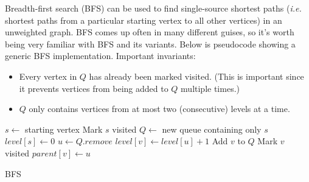 \documentclass[10pt]{book}
\begin{document}
Breadth-first search (BFS) can be used to find single-source shortest
paths (\emph{i.e.} shortest paths from a particular starting vertex to
all other vertices) in an unweighted graph. BFS comes up often in many
different guises, so it's worth being very familiar with BFS and its
variants. Below is pseudocode showing a generic BFS implementation.
Important invariants:
\begin{itemize}
\item Every vertex in $Q$ has already been marked visited. (This is
  important since it prevents vertices from being added to $Q$
  multiple times.)
\item $Q$ only contains vertices from at most two (consecutive) levels
  at a time.
\end{itemize}

\begin{center}
\begin{minipage}{0.8\textwidth}
\begin{algorithm}[H]
  \begin{algorithmic}[1]
\State $s \gets$ starting vertex
\State Mark $s$ visited
\State $Q \gets$ new queue containing only $s$
\State $\mathit{level}[s] \gets 0$
  \State $u \gets Q.\mathit{remove}$
      \State $\mathit{level}[v] \gets \mathit{level}[u] + 1$ 
      \State Add $v$ to $Q$
      \State Mark $v$ visited
      \State $\mathit{parent}[v] \gets u$ 
    \EndIf
  \EndFor
\EndWhile
  \end{algorithmic}
\caption{BFS}
\end{algorithm}
\end{minipage}
\end{center}
\end{document}
